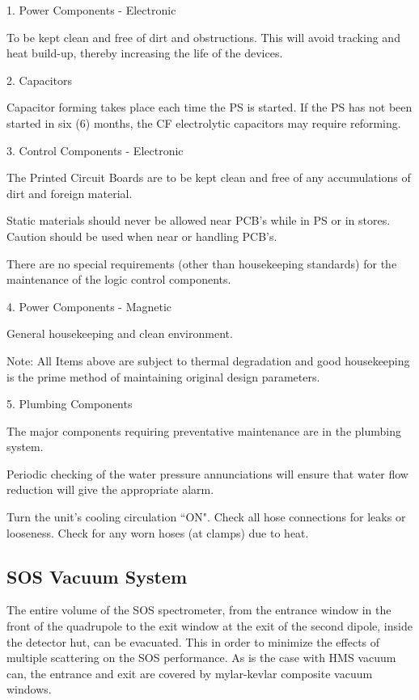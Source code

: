 \begin{description}
\item{1.} Power Components - Electronic
\item{}\hskip0.3in To be kept clean and free of dirt and obstructions.
This will avoid tracking and heat build-up, thereby increasing the life of the
devices.
\item{2.} Capacitors
\item{}\hskip0.3in Capacitor forming takes place each time the PS is started.
If the PS has not been started in six (6) months, the CF electrolytic
capacitors may require reforming.
\item{3.} Control Components - Electronic
\item{}\hskip0.3in The Printed Circuit Boards are to be kept clean and free
of any accumulations of dirt and foreign material.
\item{}\hskip0.3in Static materials should never be allowed near PCB's while
in PS or in stores.  Caution should be used when near or handling PCB's.
\item{}\hskip0.3in There are no special requirements (other than housekeeping
standards) for the maintenance of the logic control components.
\item{4.} Power Components - Magnetic
\item{}\hskip0.3in General housekeeping and clean environment.
\item{Note:} All Items above are subject to thermal degradation and good
housekeeping is the prime method of maintaining original design
parameters.
\item{5.} Plumbing Components
\item{}\hskip0.3in The major components requiring preventative maintenance are
in the plumbing system.
\item{}\hskip0.3in Periodic checking of the water pressure annunciations will
ensure that water flow reduction will give the appropriate alarm.
\item{}\hskip0.3in Turn the unit's cooling circulation ``ON".  Check all hose
connections for leaks or looseness.  Check for any worn hoses (at
clamps) due to heat.
\end{description}

\subsection{SOS Vacuum System }

The entire volume of the SOS spectrometer, from the entrance window in the
front of the quadrupole to the exit window at the exit of the second dipole,
inside the detector hut,
can be evacuated. This in order to minimize the effects of multiple
scattering on the SOS performance. As is the case with HMS vacuum can,
the entrance and exit are covered
by mylar-kevlar composite vacuum windows.


